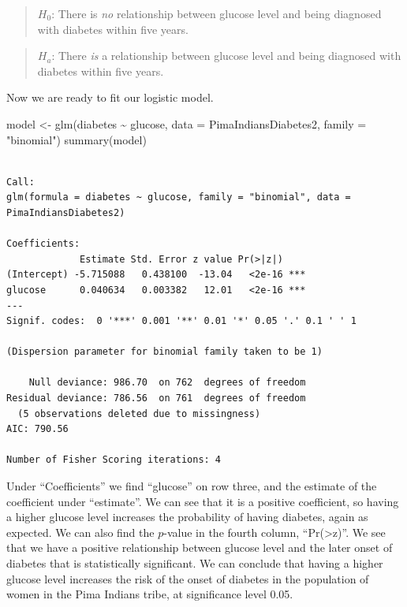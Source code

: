 \documentclass[
  letterpaper,
  DIV=11,
  numbers=noendperiod]{scrreprt}
\newenvironment{Shaded}{\begin{snugshade}}{\end{snugshade}}
\newcommand{\AttributeTok}[1]{\textcolor[rgb]{0.40,0.45,0.13}{#1}}
\newcommand{\FunctionTok}[1]{\textcolor[rgb]{0.28,0.35,0.67}{#1}}
\newcommand{\NormalTok}[1]{\textcolor[rgb]{0.00,0.23,0.31}{#1}}
\newcommand{\OtherTok}[1]{\textcolor[rgb]{0.00,0.23,0.31}{#1}}
\newcommand{\SpecialCharTok}[1]{\textcolor[rgb]{0.37,0.37,0.37}{#1}}
\newcommand{\StringTok}[1]{\textcolor[rgb]{0.13,0.47,0.30}{#1}}
\begin{document}
\begin{quote}
\textbf{\(H_0\)}: There is \emph{no} relationship between glucose level
and being diagnosed with diabetes within five years.
\end{quote}

\begin{quote}
\textbf{\(H_a\)}: There \emph{is} a relationship between glucose level
and being diagnosed with diabetes within five years.
\end{quote}

Now we are ready to fit our logistic model.

\begin{Shaded}
\begin{Highlighting}[]
\NormalTok{model }\OtherTok{\textless{}{-}} \FunctionTok{glm}\NormalTok{(diabetes }\SpecialCharTok{\textasciitilde{}}\NormalTok{ glucose, }\AttributeTok{data =}\NormalTok{ PimaIndiansDiabetes2, }\AttributeTok{family =} \StringTok{"binomial"}\NormalTok{)}
\FunctionTok{summary}\NormalTok{(model)}
\end{Highlighting}
\end{Shaded}

\begin{verbatim}

Call:
glm(formula = diabetes ~ glucose, family = "binomial", data = PimaIndiansDiabetes2)

Coefficients:
             Estimate Std. Error z value Pr(>|z|)    
(Intercept) -5.715088   0.438100  -13.04   <2e-16 ***
glucose      0.040634   0.003382   12.01   <2e-16 ***
---
Signif. codes:  0 '***' 0.001 '**' 0.01 '*' 0.05 '.' 0.1 ' ' 1

(Dispersion parameter for binomial family taken to be 1)

    Null deviance: 986.70  on 762  degrees of freedom
Residual deviance: 786.56  on 761  degrees of freedom
  (5 observations deleted due to missingness)
AIC: 790.56

Number of Fisher Scoring iterations: 4
\end{verbatim}

Under ``Coefficients'' we find ``glucose'' on row three, and the
estimate of the coefficient under ``estimate''. We can see that it is a
positive coefficient, so having a higher glucose level increases the
probability of having diabetes, again as expected. We can also find the
\(p\)-value in the fourth column,
``Pr(\textgreater\textbar z\textbar)''. We see that we have a positive
relationship between glucose level and the later onset of diabetes that
is statistically significant. We can conclude that having a higher
glucose level increases the risk of the onset of diabetes in the
population of women in the Pima Indians tribe, at significance level
0.05.
\end{document}
